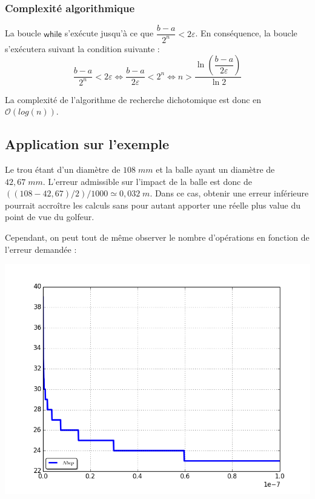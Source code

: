\documentclass[10pt,fleqn]{article} %
\begin{document}
\subsubsection{Complexité algorithmique}

La boucle $\textsf{while}$ s'exécute jusqu'à ce que $\dfrac{b-a}{2^n}<2\varepsilon$. En conséquence, la boucle s'exécutera suivant la condition suivante : 
$$\dfrac{b-a}{2^n}<2\varepsilon 
\Longleftrightarrow
\dfrac{b-a}{2\varepsilon}<2^n
\Longleftrightarrow
n> \dfrac{\ln\left(\dfrac{b-a}{2\varepsilon}\right)}{\ln 2}$$

La complexité de l'algorithme de recherche dichotomique est donc en $\mathcal{O}(log(n))$.

\subsection{Application sur l'exemple}


\begin{minipage}[c]{.49\linewidth}
Le trou étant d'un diamètre de $108\;mm$ et la balle ayant un diamètre de $42,67\; mm$. L'erreur admissible sur l'impact de la balle est donc de $((108-42,67)/2)/1000 \simeq 0,032\; m$. Dans ce cas, obtenir une erreur inférieure pourrait accroître les calculs sans pour autant apporter une réelle plus value du point de vue du golfeur.

Cependant, on peut tout de même observer le nombre d'opérations en fonction de l'erreur demandée :
\end{minipage}\hfill
\begin{minipage}[c]{.49\linewidth} 
\begin{center}
\includegraphics[width=.9\textwidth]{images/courbe_erreur_dicho}
\end{center}
\end{minipage}
\end{document}
